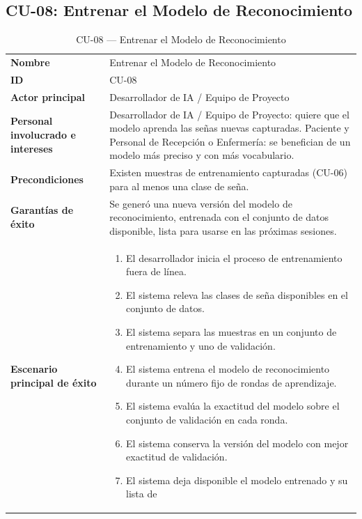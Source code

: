 \subsection{CU-08: Entrenar el Modelo de Reconocimiento}

\begin{longtable}{@{}>{\raggedright\arraybackslash}p{4.1cm} >{\raggedright\arraybackslash}p{\dimexpr\textwidth-4.1cm-2\tabcolsep\relax}@{}}
\caption{CU-08 --- Entrenar el Modelo de Reconocimiento}\\
\toprule
\textbf{Nombre} & Entrenar el Modelo de Reconocimiento \\
\textbf{ID} & CU-08 \\
\textbf{Actor principal} & Desarrollador de IA / Equipo de Proyecto \\
\textbf{Personal involucrado e intereses} &
Desarrollador de IA / Equipo de Proyecto: quiere que el modelo aprenda las
señas nuevas capturadas. \newline
Paciente y Personal de Recepción o Enfermería: se benefician de un modelo
más preciso y con más vocabulario. \\
\textbf{Precondiciones} &
Existen muestras de entrenamiento capturadas (CU-06) para al menos una
clase de seña. \\
\textbf{Garantías de éxito} &
Se generó una nueva versión del modelo de reconocimiento, entrenada con
el conjunto de datos disponible, lista para usarse en las próximas
sesiones. \\
\textbf{Escenario principal de éxito} &
\begin{enumerate}[leftmargin=*, itemsep=2pt]
    \item El desarrollador inicia el proceso de entrenamiento fuera de
    línea.
    \item El sistema releva las clases de seña disponibles en el conjunto
    de datos.
    \item El sistema separa las muestras en un conjunto de entrenamiento
    y uno de validación.
    \item El sistema entrena el modelo de reconocimiento durante un
    número fijo de rondas de aprendizaje.
    \item El sistema evalúa la exactitud del modelo sobre el conjunto de
    validación en cada ronda.
    \item El sistema conserva la versión del modelo con mejor exactitud
    de validación.
    \item El sistema deja disponible el modelo entrenado y su lista de

\end{enumerate}
\end{longtable}
